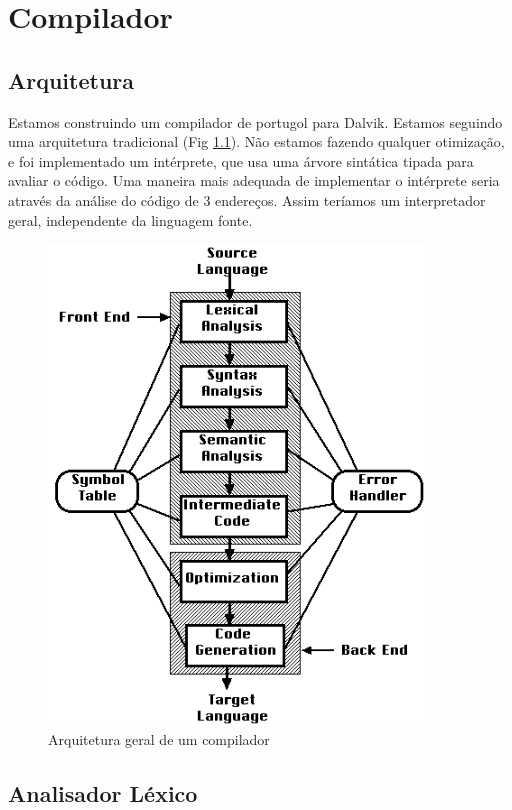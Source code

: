 \documentclass[12pt,a4paper,twoside]{report}
\begin{document}
\chapter{Compilador}

\section{Arquitetura}
Estamos construindo um compilador de portugol para Dalvik. Estamos seguindo uma arquitetura
tradicional (Fig \ref{fig:arquitetura-compilador}). Não estamos fazendo qualquer otimização, e foi
implementado um intérprete, que usa uma árvore sintática tipada para avaliar o código.
Uma maneira mais adequada de implementar o intérprete seria através da análise do código de 3 endereços. Assim teríamos
um interpretador geral, independente da linguagem fonte.

\begin{figure}[h]
	\centering
	\includegraphics[width=10cm]{imagens/arquitetura-compilador}
	\caption{Arquitetura geral de um compilador}
	\label{fig:arquitetura-compilador}
\end{figure}

\section{Analisador Léxico}
\end{document}

